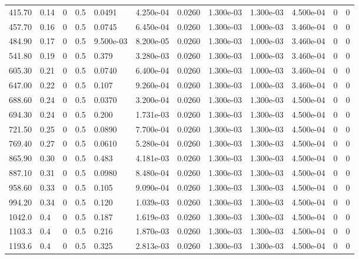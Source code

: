 \documentclass[preview]{standalone}
\begin{document}
{{\begin{tabular}{L{1.2cm}C{1.2cm} C{0.3cm}C{0.5cm} C{1.4cm}C{1.4cm} C{1.4cm}C{1.4cm} C{1.6cm}C{1.6cm} C{1.6cm}C{1.6cm}}
  415.70  &  0.14  & 0     & 0.5 &  0.0491  & 4.250e-04  &  0.0260&   1.300e-03& 1.300e-03 & 4.500e-04   &  0 & 0  \\ 
  457.70  &  0.16  & 0     & 0.5 &  0.0745  & 6.450e-04  &  0.0260&   1.300e-03& 1.000e-03 & 3.460e-04   &  0 & 0  \\ 
  484.90  &  0.17  & 0     & 0.5 &  9.500e-03  & 8.200e-05  &  0.0260&   1.300e-03& 1.000e-03 & 3.460e-04   &  0 & 0  \\ 
  541.80  &  0.19  & 0     & 0.5 &  0.379  & 3.280e-03  &  0.0260&   1.300e-03& 1.000e-03 & 3.460e-04   &  0 & 0  \\ 
  605.30  &  0.21  & 0     & 0.5 &  0.0740  & 6.400e-04  &  0.0260&   1.300e-03& 1.000e-03 & 3.460e-04   &  0 & 0  \\ 
  647.00  &  0.22  & 0     & 0.5 &  0.107  & 9.260e-04  &  0.0260&   1.300e-03& 1.000e-03 & 3.460e-04   &  0 & 0  \\ 
  688.60  &  0.24  & 0     & 0.5 &  0.0370  & 3.200e-04  &  0.0260&   1.300e-03& 1.300e-03 & 4.500e-04   &  0 & 0  \\ 
  694.30  &  0.24  & 0     & 0.5 &  0.200  & 1.731e-03  &  0.0260&   1.300e-03& 1.300e-03 & 4.500e-04   &  0 & 0  \\ 
  721.50  &  0.25  & 0     & 0.5 &  0.0890  & 7.700e-04  &  0.0260&   1.300e-03& 1.300e-03 & 4.500e-04   &  0 & 0  \\ 
  769.40  &  0.27  & 0     & 0.5 &  0.0610  & 5.280e-04  &  0.0260&   1.300e-03& 1.300e-03 & 4.500e-04   &  0 & 0  \\ 
  865.90  &  0.30  & 0     & 0.5 &  0.483  & 4.181e-03  &  0.0260&   1.300e-03& 1.300e-03 & 4.500e-04   &  0 & 0  \\ 
  887.10  &  0.31  & 0     & 0.5 &  0.0980  & 8.480e-04  &  0.0260&   1.300e-03& 1.300e-03 & 4.500e-04   &  0 & 0  \\ 
  958.60  &  0.33  & 0     & 0.5 &  0.105  & 9.090e-04  &  0.0260&   1.300e-03& 1.300e-03 & 4.500e-04   &  0 & 0  \\ 
  994.20  &  0.34  & 0     & 0.5 &  0.120  & 1.039e-03  &  0.0260&   1.300e-03& 1.300e-03 & 4.500e-04   &  0 & 0  \\ 
  1042.0  &   0.4  & 0     & 0.5 &  0.187  & 1.619e-03  &  0.0260&   1.300e-03& 1.300e-03 & 4.500e-04   &  0 & 0  \\ 
  1103.3  &   0.4  & 0     & 0.5 &  0.216  & 1.870e-03  &  0.0260&   1.300e-03& 1.300e-03 & 4.500e-04   &  0 & 0  \\ 
  1193.6  &   0.4  & 0     & 0.5 &  0.325  & 2.813e-03  &  0.0260&   1.300e-03& 1.300e-03 & 4.500e-04   &  0 & 0  \\ 

\end{tabular}}}
\end{document}
